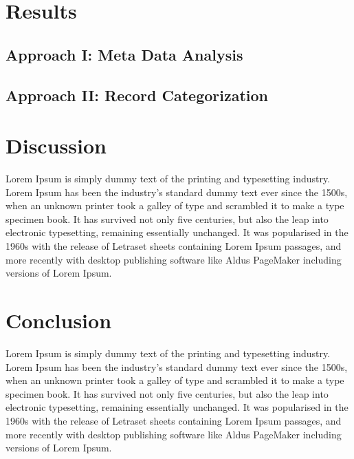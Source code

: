 \documentclass[11pt, notitlepage,abstracton,oneside]{article}   	%
\begin{document}
\section{Results}

\subsection{Approach I: Meta Data Analysis}

\subsection{Approach II: Record Categorization}

\section{Discussion}
Lorem Ipsum is simply dummy text of the printing and typesetting industry. Lorem Ipsum has been the industry's standard dummy text ever since the 1500s, when an unknown printer took a galley of type and scrambled it to make a type specimen book. It has survived not only five centuries, but also the leap into electronic typesetting, remaining essentially unchanged. It was popularised in the 1960s with the release of Letraset sheets containing Lorem Ipsum passages, and more recently with desktop publishing software like Aldus PageMaker including versions of Lorem Ipsum.

\section{Conclusion}
Lorem Ipsum is simply dummy text of the printing and typesetting industry. Lorem Ipsum has been the industry's standard dummy text ever since the 1500s, when an unknown printer took a galley of type and scrambled it to make a type specimen book. It has survived not only five centuries, but also the leap into electronic typesetting, remaining essentially unchanged. It was popularised in the 1960s with the release of Letraset sheets containing Lorem Ipsum passages, and more recently with desktop publishing software like Aldus PageMaker including versions of Lorem Ipsum.




\end{document}
